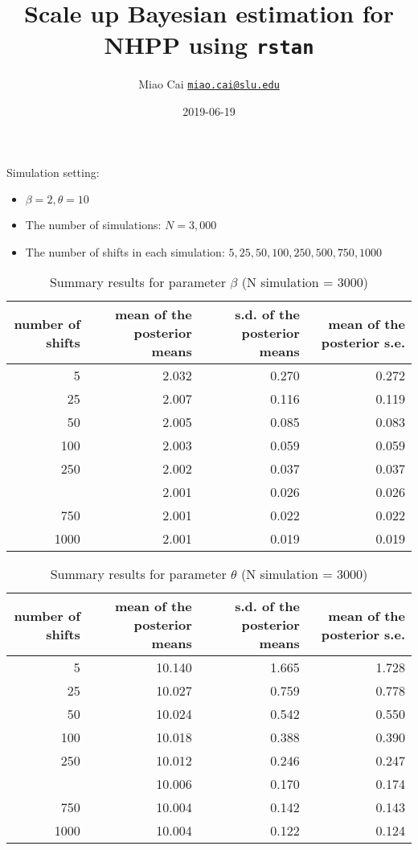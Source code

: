 \documentclass[]{article}
\title{Scale up Bayesian estimation for NHPP using \texttt{rstan}}
\author{Miao Cai \href{mailto:miao.cai@slu.edu}{\nolinkurl{miao.cai@slu.edu}}}
\date{2019-06-19}
\providecommand{\tightlist}{%
  \setlength{\itemsep}{0pt}\setlength{\parskip}{0pt}}
\begin{document}
\maketitle

Simulation setting:

\begin{itemize}
\tightlist
\item
  \(\beta = 2, \theta = 10\)
\item
  The number of simulations: \(N = 3,000\)
\item
  The number of shifts in each simulation: \(5, 25, 50, 100, 250, 500, 750, 1000\)
\end{itemize}

\begin{table}[!h]

\caption{\label{tab:unnamed-chunk-3}Summary results for parameter $\beta$ (N simulation = 3000)}
\centering
\begin{tabular}{rrrr}
\toprule
number of shifts & mean of the posterior means & s.d. of the posterior means & mean of the posterior s.e.\\
\midrule
\rowcolor{gray!6}  5 & 2.032 & 0.270 & 0.272\\
25 & 2.007 & 0.116 & 0.119\\
\rowcolor{gray!6}  50 & 2.005 & 0.085 & 0.083\\
100 & 2.003 & 0.059 & 0.059\\
\rowcolor{gray!6}  250 & 2.002 & 0.037 & 0.037\\
\addlinespace
500 & 2.001 & 0.026 & 0.026\\
\rowcolor{gray!6}  750 & 2.001 & 0.022 & 0.022\\
1000 & 2.001 & 0.019 & 0.019\\
\bottomrule
\end{tabular}
\end{table}

\begin{table}[!h]

\caption{\label{tab:unnamed-chunk-4}Summary results for parameter $\theta$ (N simulation = 3000)}
\centering
\begin{tabular}{rrrr}
\toprule
number of shifts & mean of the posterior means & s.d. of the posterior means & mean of the posterior s.e.\\
\midrule
\rowcolor{gray!6}  5 & 10.140 & 1.665 & 1.728\\
25 & 10.027 & 0.759 & 0.778\\
\rowcolor{gray!6}  50 & 10.024 & 0.542 & 0.550\\
100 & 10.018 & 0.388 & 0.390\\
\rowcolor{gray!6}  250 & 10.012 & 0.246 & 0.247\\
\addlinespace
500 & 10.006 & 0.170 & 0.174\\
\rowcolor{gray!6}  750 & 10.004 & 0.142 & 0.143\\
1000 & 10.004 & 0.122 & 0.124\\
\bottomrule
\end{tabular}
\end{table}
\end{document}
